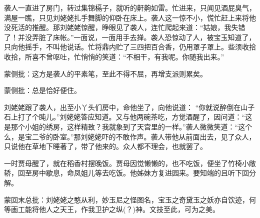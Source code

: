 \begin{parag}


    袭人一直进了房门，转过集锦槅子，就听的鼾齁如雷。忙进来，只闻见酒屁臭气，满屋一瞧，只见刘姥姥扎手舞脚的仰卧在床上。袭人这一惊不小，慌忙赶上来将他没死活的推醒。那刘姥姥惊醒，睁眼见了袭人，连忙爬起来道：“姑娘，我失错了！并没弄脏了床帐。”一面说，一面用手去掸。袭人恐惊动了人，被宝玉知道了，只向他摇手，不叫他说话。忙将鼎内贮了三四把百合香，仍用罩子罩上。些须收拾收拾，所喜不曾呕吐，忙悄悄的笑道：“不相干，有我呢。你随我出来。”\begin{note}蒙侧批：这方是袭人的平素笔，至此不得不屈，再增支派则累矣。\end{note}\begin{note}蒙侧批：总是恰好便住。\end{note}刘姥姥跟了袭人，出至小丫头们房中，命他坐了，向他说道： “你就说醉倒在山子石上打了个盹儿。”刘姥姥答应知道。又与他两碗茶吃，方觉酒醒了，因问道：“这是那个小姐的绣房，这样精致？我就象到了天宫里的一样。”袭人微微笑道：“这个么，是宝二爷的卧室。”那刘姥姥吓的不敢作声。袭人带他从前面出去，见了众人，只说他在草地下睡著了，带了他来的。众人都不理会，也就罢了。
\end{parag}


\begin{parag}


    一时贾母醒了，就在稻香村摆晚饭。贾母因觉懒懒的，也不吃饭，便坐了竹椅小敞轿，回至房中歇息，命凤姐儿等去吃饭。他姊妹方复进园来。要知端的且听下回分解。
\end{parag}

\begin{parag}

    \begin{note}蒙回末总批：刘姥姥之憨从利，妙玉尼之怪图名，宝玉之奇黛玉之妖亦自饮迹，何等画工能将他人之天王，作我卫护之纵(？)神。文技至此，可为之美。\end{note}
\end{parag}

